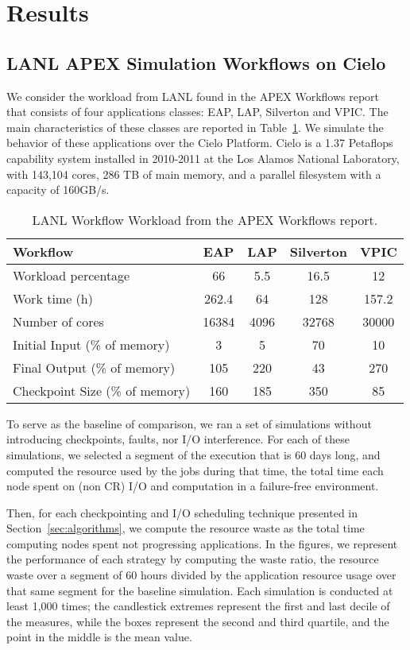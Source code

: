 
\section{Results}\label{sec:results}

\subsection{LANL APEX Simulation Workflows on Cielo}

We consider the workload from LANL found in the APEX Workflows
report~\cite{apex2016} that consists of four applications
classes: EAP, LAP, Silverton and VPIC. The main characteristics of
these classes are reported in Table~\ref{table:lanl}. We simulate the
behavior of these applications over the Cielo Platform. Cielo is a
1.37 Petaflops capability system installed in 2010-2011 at the Los
Alamos National Laboratory, with 143,104 cores, 286 TB of main memory,
and a parallel filesystem with a capacity of 160GB/s.

\begin{table}
\begin{tabular}{|l|c|c|c|c|}
\hline
 Workflow & EAP & LAP & Silverton & VPIC \\\hline
Workload percentage & 66 & 5.5 & 16.5 & 12 \\\hline
Work time (h) & 262.4 & 64 & 128 & 157.2 \\\hline
Number of cores & 16384 & 4096 & 32768 & 30000 \\\hline
Initial Input (\% of memory) &  3 & 5 & 70 & 10 \\\hline
Final Output (\% of memory) & 105 & 220 & 43 & 270 \\\hline
Checkpoint Size (\% of memory) & 160 & 185 & 350 & 85 \\\hline
\end{tabular}
\caption{LANL Workflow Workload from the APEX Workflows report.\label{table:lanl}}
\end{table}

To serve as the baseline of comparison, we ran a set of simulations
without introducing checkpoints, faults, nor I/O interference. For
each of these simulations, we selected a segment of the execution that
is 60 days long, and computed the resource used by the jobs during
that time, \ie the total time each node spent on (non CR) I/O and
computation in a failure-free environment.

Then, for each checkpointing and I/O scheduling technique presented in
Section~\ref{sec:algorithms}, we compute the resource waste as the
total time computing nodes spent not progressing applications. In the
figures, we represent the performance of each strategy by computing
the waste ratio, \ie the resource waste over a segment of 60 hours
divided by the application resource usage over that same segment for
the baseline simulation. Each simulation is conducted at least 1,000
times; the candlestick extremes represent the first and last decile of
the measures, while the boxes represent the second and third quartile,
and the point in the middle is the mean value.

